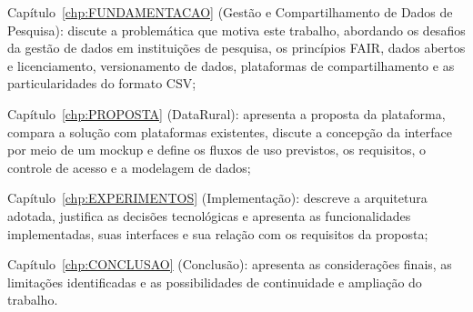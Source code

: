 \begin{compactitem}
    \item Capítulo~\ref{chp:FUNDAMENTACAO} (Gestão e Compartilhamento de Dados de Pesquisa): discute a problemática que motiva este trabalho, abordando os desafios da gestão de dados em instituições de pesquisa, os princípios FAIR, dados abertos e licenciamento, versionamento de dados, plataformas de compartilhamento e as particularidades do formato CSV;

    \item Capítulo~\ref{chp:PROPOSTA} (DataRural): apresenta a proposta da plataforma, compara a solução com plataformas existentes, discute a concepção da interface por meio de um mockup e define os fluxos de uso previstos, os requisitos, o controle de acesso e a modelagem de dados;

    \item Capítulo~\ref{chp:EXPERIMENTOS} (Implementação): descreve a arquitetura adotada, justifica as decisões tecnológicas e apresenta as funcionalidades implementadas, suas interfaces e sua relação com os requisitos da proposta;

    \item Capítulo~\ref{chp:CONCLUSAO} (Conclusão): apresenta as considerações finais, as limitações identificadas e as possibilidades de continuidade e ampliação do trabalho.
\end{compactitem}